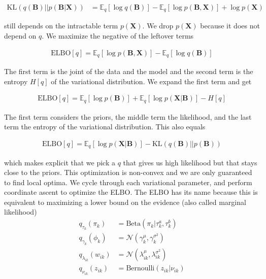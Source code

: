 \documentclass[11pt]{article}
\theoremstyle{definition}
\theoremstyle{plain}
\newcommand{\E}{\mathbb{E}}
\newcommand{\Beta}{\text{Beta}}
\newcommand{\Bernoulli}{\text{Bernoulli}}
\newcommand{\Elbo}{\text{ELBO}}
\newcommand{\KL}{\text{KL}}
\begin{document}
\begin{align*}
    \KL(q(\mathbf{B})||p(\mathbf{B}|\mathbf{X})) &= \E_q[\log q(\mathbf{B})] - \E_q[\log p(\mathbf{B,X})] + \log p(\mathbf{X})
\end{align*}

\noindent still depends on the intractable term $p(\mathbf{X})$. We drop $p(\mathbf{X})$ because
it does not depend on $q$. We maximize the negative of the leftover terms

\begin{align*}
    \Elbo[q] = \E_q[\log p(\mathbf{B,X})] - \E_q[\log q(\mathbf{B})] 
\end{align*}

\noindent The first term is the joint of the data and the model and
the second term is the entropy $H[q]$ of the variational distribution. 
We expand the first term and get 

\begin{align*}
    \Elbo[q] = \E_q[\log p(\mathbf{B})] + \E_q[\log p(\mathbf{X}|\mathbf{B})] - H[q]
\end{align*}

\noindent The first term considers the priors, the middle term the likelihood, and the last term
the entropy of the variational distribution. This also equals 

\begin{align*}
    \Elbo[q] = \E_q[\log p(\mathbf{X}|\mathbf{B})] - \KL(q(\mathbf{B}) || p(\mathbf{B}))
\end{align*}

\noindent which makes explicit that we pick a $q$ that gives us high likelihood but that stays close to the priors. 
This optimization is non-convex and we are only guaranteed to find local optima. We cycle through each variational parameter, and perform coordinate ascent 
to optimize the ELBO. The ELBO has its name because this is equivalent to maximizing a lower bound on the evidence (also called marginal likelihood)\\

\begin{align*}
    q_{\tau_k}(\pi_k) &= \Beta(\pi_k|\tau_k^a, \tau_k^b)\\
    q_{\gamma_k}(\phi_k) &= \mathcal{N}(\gamma_{k}^{\mu}, \gamma_{k}^{\sigma^2})\\
    q_{\lambda_{ik}}(w_{ik}) &= \mathcal{N}(\lambda_{ik}^{\mu}, \lambda_{ik}^{\sigma^2})\\
    q_{\nu_{ik}}(z_{ik}) &= \Bernoulli(z_{ik}|\nu_{ik})
\end{align*}
\end{document}
